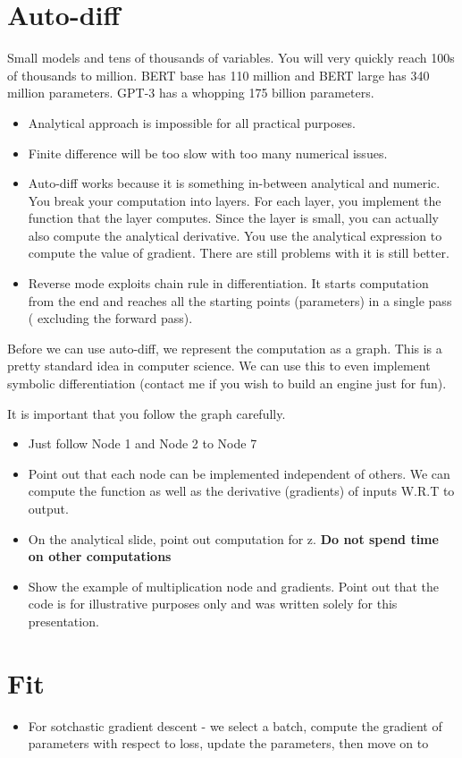 \documentclass[14pt, twocolumn]{article}
\begin{document}
\section*{Auto-diff}
Small models and tens of thousands of variables. You will very quickly reach 
100s of thousands to million. BERT base has 110 million and BERT large has 
340 million parameters. GPT-3 has a whopping 175 billion parameters. 
\begin{itemize}
	\item Analytical approach is impossible for all practical purposes. 
	\item Finite difference will be too slow with too many numerical issues. 
	\item Auto-diff works because it is something in-between analytical and 
	numeric. You break your computation into layers. For each layer, you implement 
	the function that the layer computes. Since the layer is small, you can actually 
	also compute the analytical derivative. You use the analytical expression to 
	compute the value of gradient. There are still problems with it is still better. 
	\item Reverse mode exploits chain rule in differentiation. It starts computation 
	from the end and reaches all the starting points (parameters) in a single pass (
	excluding the forward pass).  
\end{itemize}
Before we can use auto-diff, we represent the computation as a graph. This is a pretty 
standard idea in computer science. We can use this to even implement symbolic 
differentiation (contact me if you wish to build an engine just for fun). 

It is important  that you follow the graph carefully. 

\begin{itemize}
	\item Just follow Node 1 and Node 2 to Node 7
	\item Point out that each node can be implemented independent of others. We 
	can compute the function as well as the derivative (gradients) of inputs W.R.T
	to output. 
	\item On the analytical slide, point out computation for z. {\bf Do not spend 
	time on other computations}
	\item Show the example of multiplication node and gradients. Point out that 
	the code is for illustrative purposes only and was written solely for this 
	presentation.
\end{itemize}

\section*{Fit}
\begin{itemize}
	\item For sotchastic gradient  descent - we select a batch, compute the gradient 
	of parameters with respect to loss, update the parameters, then move on to
\end{itemize}
\end{document}
